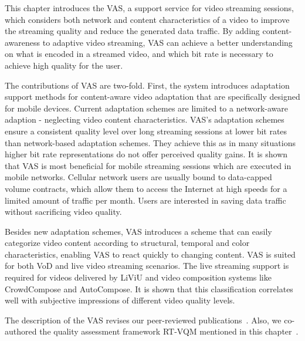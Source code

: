 This chapter introduces the \ac{VAS}, a support service for video streaming sessions, which considers both network and content characteristics of a video to improve the streaming quality and reduce the generated data traffic.
By adding content-awareness to adaptive video streaming, \ac{VAS} can achieve a better understanding on what is encoded in a streamed video, and which bit rate is necessary to achieve high quality for the user.

The contributions of \ac{VAS} are two-fold.
First, the system introduces adaptation support methods for content-aware video adaptation that are specifically designed for mobile devices.
Current adaptation schemes are limited to a network-aware adaption - neglecting video content characteristics.
\ac{VAS}'s adaptation schemes ensure a consistent quality level over long streaming sessions at lower bit rates than network-based adaptation schemes.
They achieve this as in many situations higher bit rate representations do not offer perceived quality gains.
It is shown that \ac{VAS} is most beneficial for mobile streaming sessions which are executed in mobile networks.
Cellular network users are usually bound to data-capped volume contracts, which allow them to access the Internet at high speeds for a limited amount of traffic per month.
Users are interested in saving data traffic without sacrificing video quality.

Besides new adaptation schemes, \ac{VAS} introduces a scheme that can easily categorize video content according to structural, temporal and color characteristics, enabling \ac{VAS} to react quickly to changing content.
\ac{VAS} is suited for both \ac{VoD} and live video streaming scenarios.
The live streaming support is required for videos delivered by \ac{LiViU} and video composition systems like CrowdCompose and AutoCompose.
It is shown that this classification correlates well with subjective impressions of different video quality levels.

The description of the \ac{VAS} revises our peer-reviewed publications~\cite{Wilk2016c,Wilk2016b,Wilk2015}.
Also, we co-authored the quality assessment framework \ac{RT-VQM} mentioned in this chapter~\cite{Wichtlhuber2016}.